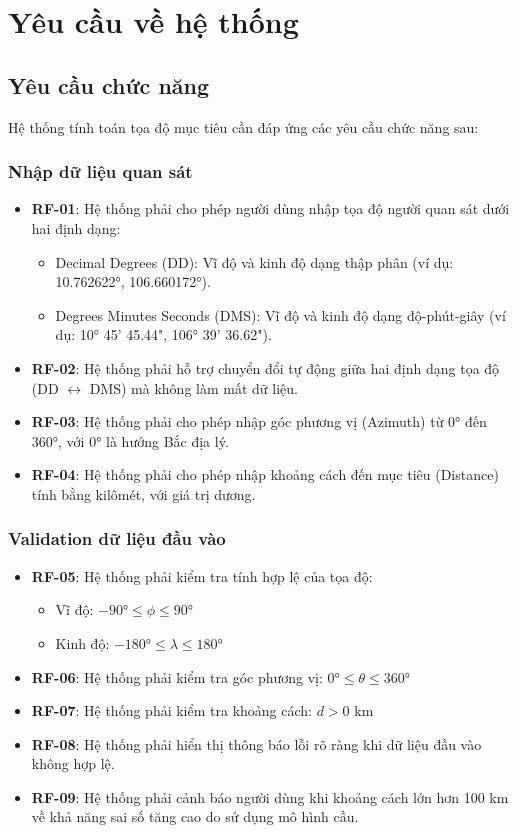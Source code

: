 \section{Yêu cầu về hệ thống}

\subsection{Yêu cầu chức năng}
Hệ thống tính toán tọa độ mục tiêu cần đáp ứng các yêu cầu chức năng sau:

\subsubsection{Nhập dữ liệu quan sát}
\begin{itemize}
    \item \textbf{RF-01}: Hệ thống phải cho phép người dùng nhập tọa độ người quan sát dưới hai định dạng:
    \begin{itemize}
        \item Decimal Degrees (DD): Vĩ độ và kinh độ dạng thập phân (ví dụ: 10.762622°, 106.660172°).
        \item Degrees Minutes Seconds (DMS): Vĩ độ và kinh độ dạng độ-phút-giây (ví dụ: 10° 45' 45.44", 106° 39' 36.62").
    \end{itemize}
    \item \textbf{RF-02}: Hệ thống phải hỗ trợ chuyển đổi tự động giữa hai định dạng tọa độ (DD $\leftrightarrow$ DMS) mà không làm mất dữ liệu.
    \item \textbf{RF-03}: Hệ thống phải cho phép nhập góc phương vị (Azimuth) từ 0° đến 360°, với 0° là hướng Bắc địa lý.
    \item \textbf{RF-04}: Hệ thống phải cho phép nhập khoảng cách đến mục tiêu (Distance) tính bằng kilômét, với giá trị dương.
\end{itemize}

\subsubsection{Validation dữ liệu đầu vào}
\begin{itemize}
    \item \textbf{RF-05}: Hệ thống phải kiểm tra tính hợp lệ của tọa độ:
    \begin{itemize}
        \item Vĩ độ: $-90° \leq \phi \leq 90°$
        \item Kinh độ: $-180° \leq \lambda \leq 180°$
    \end{itemize}
    \item \textbf{RF-06}: Hệ thống phải kiểm tra góc phương vị: $0° \leq \theta \leq 360°$
    \item \textbf{RF-07}: Hệ thống phải kiểm tra khoảng cách: $d > 0$ km
    \item \textbf{RF-08}: Hệ thống phải hiển thị thông báo lỗi rõ ràng khi dữ liệu đầu vào không hợp lệ.
    \item \textbf{RF-09}: Hệ thống phải cảnh báo người dùng khi khoảng cách lớn hơn 100 km về khả năng sai số tăng cao do sử dụng mô hình cầu.
\end{itemize}

